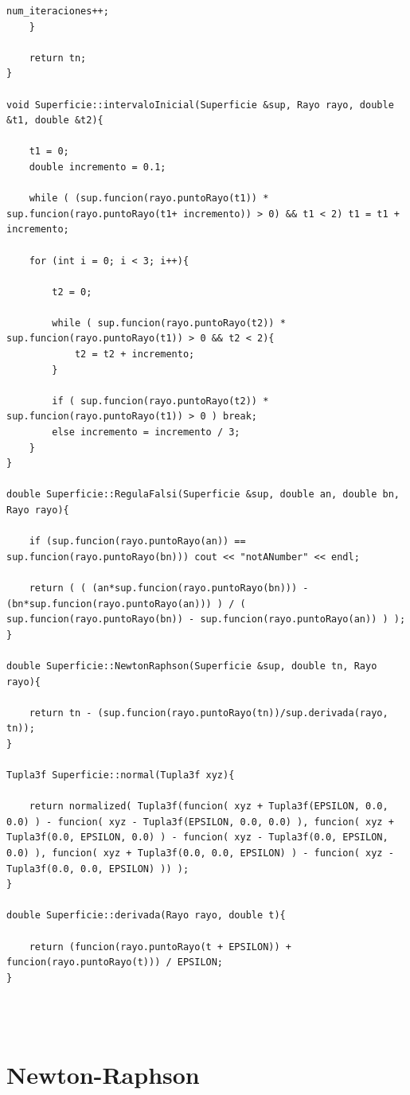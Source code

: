 \begin{lstlisting}[style=Consola]
		num_iteraciones++;
	}

	return tn;
}

void Superficie::intervaloInicial(Superficie &sup, Rayo rayo, double &t1, double &t2){

	t1 = 0;
	double incremento = 0.1;
	
	while ( (sup.funcion(rayo.puntoRayo(t1)) * sup.funcion(rayo.puntoRayo(t1+ incremento)) > 0) && t1 < 2) t1 = t1 + incremento;
	
	for (int i = 0; i < 3; i++){
	
		t2 = 0;
		
		while ( sup.funcion(rayo.puntoRayo(t2)) * sup.funcion(rayo.puntoRayo(t1)) > 0 && t2 < 2){
			t2 = t2 + incremento;
		}
		
		if ( sup.funcion(rayo.puntoRayo(t2)) * sup.funcion(rayo.puntoRayo(t1)) > 0 ) break;
		else incremento = incremento / 3;
	}
}

double Superficie::RegulaFalsi(Superficie &sup, double an, double bn, Rayo rayo){

	if (sup.funcion(rayo.puntoRayo(an)) == sup.funcion(rayo.puntoRayo(bn))) cout << "notANumber" << endl;
	
	return ( ( (an*sup.funcion(rayo.puntoRayo(bn))) - (bn*sup.funcion(rayo.puntoRayo(an))) ) / ( sup.funcion(rayo.puntoRayo(bn)) - sup.funcion(rayo.puntoRayo(an)) ) );
}

double Superficie::NewtonRaphson(Superficie &sup, double tn, Rayo rayo){

	return tn - (sup.funcion(rayo.puntoRayo(tn))/sup.derivada(rayo, tn));
}

Tupla3f Superficie::normal(Tupla3f xyz){

	return normalized( Tupla3f(funcion( xyz + Tupla3f(EPSILON, 0.0, 0.0) ) - funcion( xyz - Tupla3f(EPSILON, 0.0, 0.0) ), funcion( xyz + Tupla3f(0.0, EPSILON, 0.0) ) - funcion( xyz - Tupla3f(0.0, EPSILON, 0.0) ), funcion( xyz + Tupla3f(0.0, 0.0, EPSILON) ) - funcion( xyz - Tupla3f(0.0, 0.0, EPSILON) )) );
}

double Superficie::derivada(Rayo rayo, double t){

	return (funcion(rayo.puntoRayo(t + EPSILON)) + funcion(rayo.puntoRayo(t))) / EPSILON;
}
\end{lstlisting}
${ }$\\



${ }$\\
\section{Newton-Raphson}
${ }$\\

